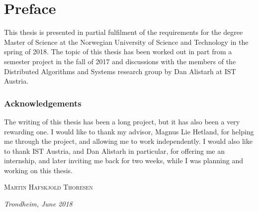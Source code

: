 \par\break\null%
\vsize%
\section*{Preface}

This thesis is presented in partial fulfilment of the requirements for the degree Master of Science
at the Norwegian University of Science and Technology in the spring of 2018. The topic of this
thesis has been worked out in part from a semester project in the fall of 2017 and discussions with
the members of the Distributed Algorithms and Systems research group by Dan Alistarh at IST Austria.


\subsubsection*{Acknowledgements}

The writing of this thesis has been a long project, but it has also been a very rewarding one.  I
would like to thank my advisor, Magnus Lie Hetland, for helping me through the project, and
allowing me to work independently. I would also like to thank IST Austria, and Dan Alistarh in
particular, for offering me an internship, and later inviting me back for two weeks, while I was
planning and working on this thesis.

\vfill
\hfill \textsc{Martin Hafskjold Thoresen}

\hfill \textit{Trondheim, June 2018}
\vfill
